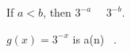 \documentclass{ximera}
\begin{document}
\begin{example}
\begin{question}



If $a < b$, then $3^{-a}$ \, \wordChoice{\choice{$<$} \choice[correct]{$>$}} \, $3^{-b}$.  \\



\end{question}





\begin{question}



$g(x) = 3^{-x}$  is a(n) \,  .  \\



\end{question}








\end{example}
\end{document}
